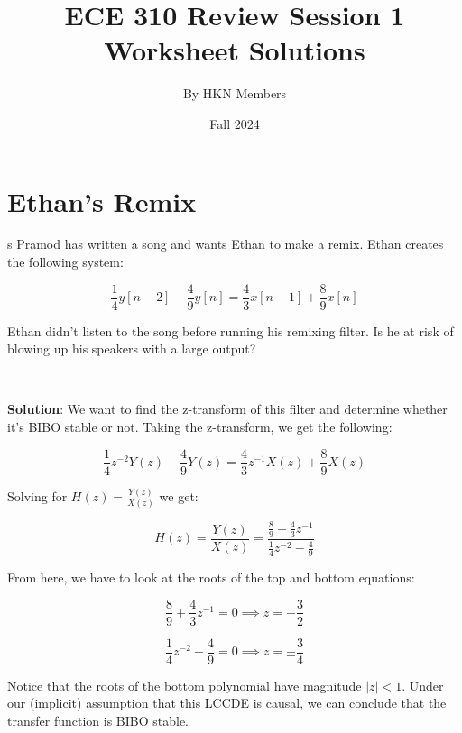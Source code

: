 \documentclass{article}
\title{ECE 310 Review Session 1 Worksheet Solutions}
\author{By HKN Members}
\date{Fall 2024}
\begin{document}
\maketitle

\section{Ethan's Remix}s
Pramod has written a song and wants Ethan to make a remix. Ethan creates the following system:

$$\frac{1}{4} y[n-2] - \frac{4}{9} y[n] = \frac{4}{3} x[n-1] + \frac{8}{9} x[n]$$

\noindent Ethan didn't listen to the song before running his remixing filter. Is he at risk of blowing up his speakers with a large output?

\

\noindent \textbf{Solution}: We want to find the z-transform of this filter and determine whether it's BIBO stable or not. Taking the z-transform, we get the following:

$$\frac{1}{4}z^{-2}Y(z) - \frac{4}{9}Y(z) = \frac{4}{3}z^{-1}X(z) + \frac{8}{9}X(z)$$

\noindent Solving for $H(z) = \frac{Y(z)}{X(z)}$ we get:

$$H(z) = \frac{Y(z)}{X(z)} = \frac{\frac{8}{9} + \frac{4}{3}z^{-1}}{\frac{1}{4}z^{-2} - \frac{4}{9}}$$

\noindent From here, we have to look at the roots of the top and bottom equations:

$$\frac{8}{9} + \frac{4}{3}z^{-1} = 0 \implies z = -\frac{3}{2}$$

$$\frac{1}{4}z^{-2} - \frac{4}{9} = 0 \implies z = \pm \frac{3}{4}$$

\noindent Notice that the roots of the bottom polynomial have magnitude $|z| < 1$. Under our (implicit) assumption that this LCCDE is causal, we can conclude that the transfer function is BIBO stable.

\newpage
\end{document}
